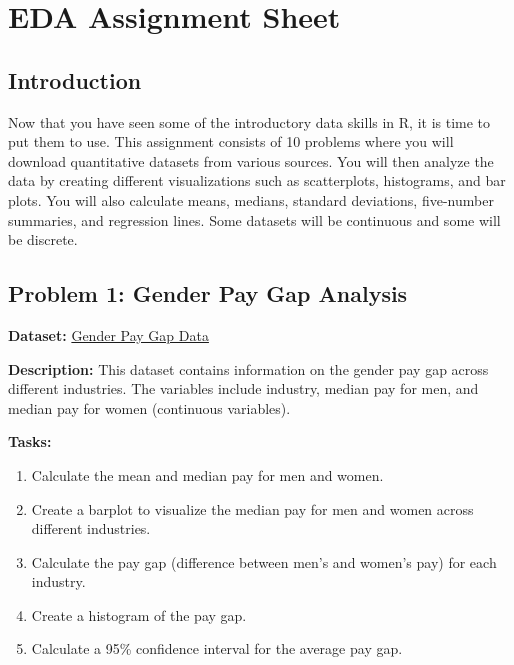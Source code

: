 \documentclass[
  letterpaper,
  DIV=11,
  numbers=noendperiod]{scrreprt}
\providecommand{\tightlist}{%
  \setlength{\itemsep}{0pt}\setlength{\parskip}{0pt}}\usepackage{longtable,booktabs,array}
\begin{document}
\chapter*{EDA Assignment Sheet}\label{eda-assignment-sheet}


\section*{Introduction}\label{introduction}


Now that you have seen some of the introductory data skills in R, it is
time to put them to use. This assignment consists of 10 problems where
you will download quantitative datasets from various sources. You will
then analyze the data by creating different visualizations such as
scatterplots, histograms, and bar plots. You will also calculate means,
medians, standard deviations, five-number summaries, and regression
lines. Some datasets will be continuous and some will be discrete.

\section*{Problem 1: Gender Pay Gap
Analysis}\label{problem-1-gender-pay-gap-analysis}


\textbf{Dataset:} \href{https://data.world/gender-pay-gap}{Gender Pay
Gap Data}

\textbf{Description:} This dataset contains information on the gender
pay gap across different industries. The variables include industry,
median pay for men, and median pay for women (continuous variables).

\textbf{Tasks:}

\begin{enumerate}
\def\labelenumi{\arabic{enumi}.}
\tightlist
\item
  Calculate the mean and median pay for men and women.
\item
  Create a barplot to visualize the median pay for men and women across
  different industries.
\item
  Calculate the pay gap (difference between men's and women's pay) for
  each industry.
\item
  Create a histogram of the pay gap.
\item
  Calculate a 95\% confidence interval for the average pay gap.
\end{enumerate}
\end{document}
